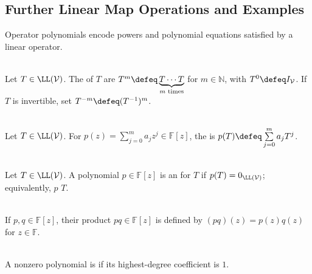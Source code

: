 \subsection{Further Linear Map Operations and Examples}

%

Operator polynomials encode powers and polynomial equations satisfied by a linear operator.

\begin{definition} \label{def:operator-powers} \\
Let $T\in\LL(\mathcal{V})$. The  of $T$ are $T^m\defeq\underbrace{T\cdots T}_{m\text{ times}}$ for $m\in\mathbb{N}$, with $T^0\defeq I_{\mathcal{V}}$. If $T$ is invertible, set $T^{-m}\defeq(T^{-1})^m$.
\end{definition}

\begin{definition} \label{def:polynomial-applied-to-operator} \\
Let $T\in\LL(\mathcal{V})$. For $p(z)=\sum\limits_{j=0}^{m}a_jz^j\in\mathbb{F}[z]$, the  is $p(T)\defeq\sum\limits_{j=0}^{m}a_jT^j$.
\end{definition}

\begin{definition} \label{def:annihilating-polynomial} \\
Let $T\in\LL(\mathcal{V})$. A polynomial $p\in\mathbb{F}[z]$ is an  for $T$ if $p(T)=0_{\LL(\mathcal{V})}$; equivalently, $p$  $T$.
\end{definition}

\begin{definition} \label{def:product-of-polynomials} \\
If $p,q\in\mathbb{F}[z]$, their product $pq\in\mathbb{F}[z]$ is defined by $(pq)(z)=p(z)q(z)$ for $z\in\mathbb{F}$.
\end{definition}

\begin{definition} \label{def:monic-polynomial} \\
A nonzero polynomial is  if its highest-degree coefficient is $1$.
\end{definition}

